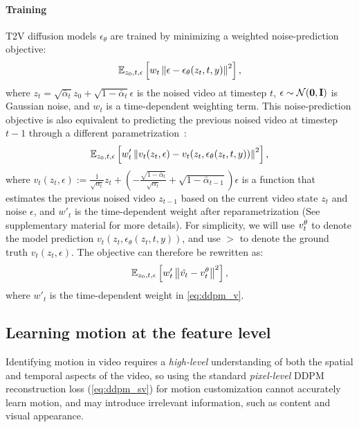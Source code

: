 \paragraph{Training}
T2V diffusion models $\epsilon_{\theta}$ are trained by minimizing a weighted noise-prediction objective:
\begin{equation}
    \mathbb{E}_{z_0, t, \epsilon}\left[w_t\left\|
\epsilon-\epsilon_{\theta}(z_t, t, y)
\right\|^2\right]
  \label{eq:ddpm_eps},
\end{equation}
where $z_t=\sqrt{\bar\alpha_t}z_0+\sqrt{1-\bar\alpha_t}\epsilon$ is the noised video at timestep $t$, $\epsilon\sim\mathcal N(\bf{0},\bf{I})$ is Gaussian noise, and $w_t$ is a time-dependent weighting term. This noise-prediction objective is also equivalent to predicting the previous noised video at timestep $t-1$ through a different parametrization~\cite{ddpm}:
\begin{equation}
    \mathbb{E}_{z_0, t, \epsilon}\left[w'_t\left\|
v_t(z_t,\epsilon)-v_t(z_t,\epsilon_{\theta}(z_t, t, y))
\right\|^2\right]
  \label{eq:ddpm_v},
\end{equation}
where $v_t(z_t,\epsilon):=\frac 1 {\sqrt{\alpha_{t}}}z_t+\left(-\frac {\sqrt{1-\bar\alpha_t}} {\sqrt{\alpha_{t}}}+\sqrt{1-\bar\alpha_{t-1}}\right)\epsilon$ is a function that estimates the previous noised video $z_{t-1}$ based on the current video state $z_t$ and noise $\epsilon$, and $w'_t$ is the time-dependent weight after reparametrization (See supplementary material for more details). For simplicity, we will use $v^{\theta}_t$ to denote the model prediction $v_t(z_t,\epsilon_{\theta}(z_t, t, y))$, and use $\gt$ to denote the ground truth $v_t(z_t,\epsilon)$. The objective can therefore be rewritten as:
\begin{equation}
    \mathbb{E}_{z_0, t, \epsilon}\left[w'_t\left\|
\hat{v_t}-v^{\theta}_t
\right\|^2\right]
  \label{eq:ddpm_sv},
\end{equation}
where $w'_t$ is the time-dependent weight in \cref{eq:ddpm_v}.

\subsection{Learning motion at the feature level}

Identifying motion in video requires a \emph{high-level} understanding of both the spatial and temporal aspects of the video, so using the standard \emph{pixel-level} DDPM reconstruction loss (\cref{eq:ddpm_sv}) for motion customization cannot accurately learn motion, and may introduce irrelevant information, such as content and visual appearance.

